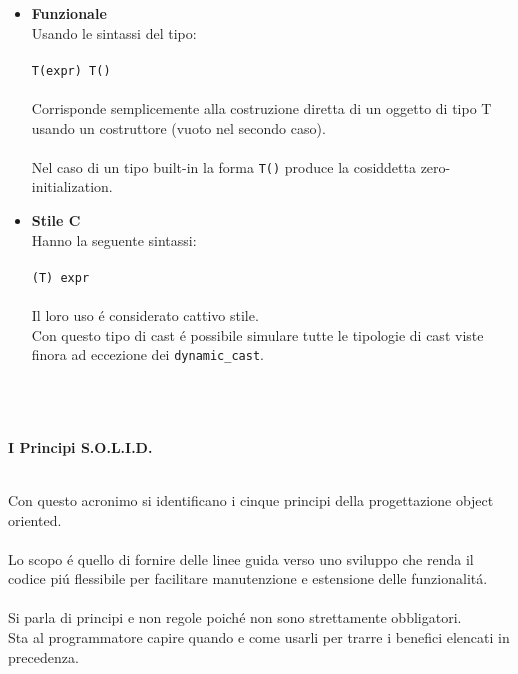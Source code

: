 \documentclass{article}
\newcommand\tab[1][1cm]{\hspace*{#1}}
\begin{document}
\begin{itemize}
\item \textbf{\textcolor{blu}{Funzionale}}\\Usando le sintassi del tipo: \\ \\ \texttt{T(expr) \tab T()} \\ \\ Corrisponde semplicemente alla costruzione diretta di un oggetto di tipo T usando un costruttore (vuoto nel secondo caso).\\ \\Nel caso di un tipo built-in la forma \texttt{T()} produce la cosiddetta zero-initialization.\\
\item \textbf{\textcolor{blu}{Stile C}}\\Hanno la seguente sintassi: \\ \\ \texttt{(T) expr} \\ \\ Il loro uso \'e considerato cattivo stile.\\Con questo tipo di cast \'e possibile simulare tutte le tipologie di cast viste finora ad eccezione dei \texttt{dynamic\_cast}.
\\ \\ \\ \\
\end{itemize}
\begin{large}\textbf{\textcolor{blu}{I Principi S.O.L.I.D.}} \\ \\ \end{large}
Con questo acronimo si identificano i cinque principi della progettazione object oriented.\\ \\Lo scopo \'e quello di fornire delle linee guida verso uno sviluppo che renda il codice pi\'u flessibile per facilitare manutenzione e estensione delle funzionalit\'a.\\ \\Si parla di principi e non regole poich\'e non sono strettamente obbligatori.\\Sta al programmatore capire quando e come usarli per trarre i benefici elencati in precedenza.\\
\end{document}
